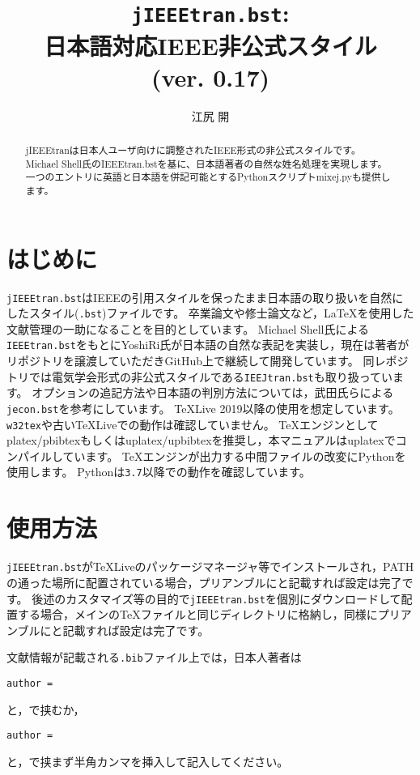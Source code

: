 \documentclass[11pt, a4paper, dvipdfmx, uplatex]{jsarticle}
\title{\texttt{jIEEEtran.bst}:\\日本語対応IEEE非公式\BibTeX スタイル\\(ver. 0.17)}
\author{江尻 開}
\begin{document}
\maketitle

\begin{abstract}
jIEEEtranは日本人ユーザ向けに調整されたIEEE形式の非公式\BibTeX スタイルです。
Michael Shell氏のIEEEtran.bstを基に、日本語著者の自然な姓名処理を実現します。
一つのエントリに英語と日本語を併記可能とするPythonスクリプトmixej.pyも提供します。
\end{abstract}


\section{はじめに}

\texttt{jIEEEtran.bst}はIEEEの引用スタイルを保ったまま日本語の取り扱いを自然にした\BibTeX スタイル(\texttt{.bst})ファイルです。
卒業論文や修士論文など，\LaTeX を使用した文献管理の一助になることを目的としています。
Michael Shell氏による\texttt{IEEEtran.bst}\cite{IEEEtran}をもとにYoshiRi氏が日本語の自然な表記を実装し，現在は著者がリポジトリを譲渡していただきGitHub上\cite{jIEEEtran}で継続して開発しています。
同レポジトリでは電気学会形式の非公式\BibTeX スタイルである\texttt{IEEJtran.bst}も取り扱っています。
オプションの追記方法や日本語の判別方法については，武田氏らによる\texttt{jecon.bst}\cite{jeconbst}を参考にしています。
\TeX Live 2019以降の使用を想定しています。
\texttt{w32tex}や古い\TeX Liveでの動作は確認していません。
\TeX エンジンとしてplatex/pbibtexもしくはuplatex/upbibtexを推奨し，本マニュアルはuplatexでコンパイルしています。
\TeX エンジンが出力する中間ファイルの改変にPythonを使用します。
Pythonは\texttt{3.7}以降での動作を確認しています。


\section{使用方法}

\texttt{jIEEEtran.bst}が\TeX Liveのパッケージマネージャ等でインストールされ，PATHの通った場所に配置されている場合，プリアンブルに\texttt{\string{}}と記載すれば設定は完了です。
後述のカスタマイズ等の目的で\texttt{jIEEEtran.bst}を個別にダウンロードして配置する場合，メインの\TeX ファイルと同じディレクトリに格納し，同様にプリアンブルに\texttt{\string{}}と記載すれば設定は完了です。

文献情報が記載される\texttt{.bib}ファイル上では，日本人著者は
\begin{center}
  \texttt{author = }
\end{center}
と，\texttt{\string{\string}}で挟むか，
\begin{center}
  \texttt{author = }
\end{center}
と，\texttt{\string{\string}}で挟まず半角カンマを挿入して記入してください。
\end{document}
